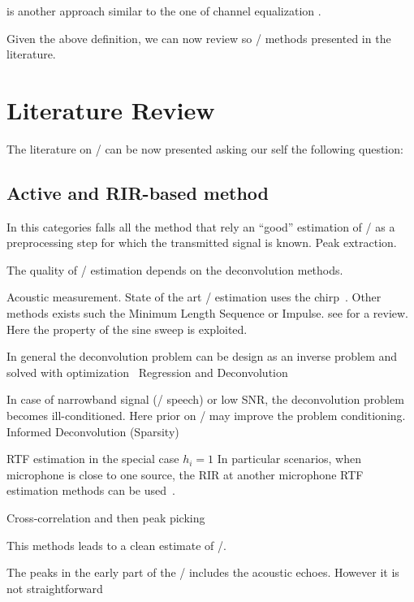 is another approach similar to the one of channel equalization .

Given the above definition, we can now review so \AER/ methods presented in the literature.

\section{Literature Review}

The literature on \AER/ can be now presented asking our self the following question:

\subsection{Active and RIR-based method}
In this categories falls all the method that rely an ``good'' estimation of \RIRs/ as a preprocessing step for which the transmitted signal is known.
Peak extraction.

The quality of \RIR/ estimation depends on the deconvolution methods.

Acoustic measurement.
State of the art \RIR/ estimation uses the chirp~.
Other methods exists such the Minimum Length Sequence or Impulse.
see  for a review.
Here the property of the sine sweep is exploited.

In general the deconvolution problem can be design as an inverse problem and solved with optimization~
Regression and Deconvolution

In case of narrowband signal (\eg/ speech) or low SNR, the deconvolution problem becomes ill-conditioned.
Here prior on \RIR/ may improve the problem conditioning.
Informed Deconvolution (Sparsity)

RTF estimation in the special case $h_i = 1$
In particular scenarios, when microphone is close to one source, the RIR at another microphone RTF estimation methods can be used~.

Cross-correlation and then peak picking

This methods leads to a clean estimate of \RIR/.

The peaks in the early part of the \RIR/ includes the acoustic echoes.
However it is not straightforward~

